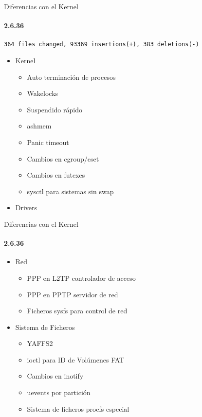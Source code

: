 \documentclass[12pt]{beamer}
\begin{document}
\begin{frame}[fragile]{Diferencias con el Kernel}
    \framesubtitle{2.6.36}
    \begin{lstlisting}
364 files changed, 93369 insertions(+), 383 deletions(-)
    \end{lstlisting}
    \begin{itemize}
        \item Kernel
        \begin{itemize}
            \item Auto terminación de procesos
            \item Wakelocks
            \item Suspendido rápido
            \item ashmem
            \item Panic timeout
            \item Cambios en cgroup/cset
            \item Cambios en futexes
            \item sysctl para sistemas sin swap
        \end{itemize}
        \item Drivers
    \end{itemize}
\end{frame}

\begin{frame}[fragile]{Diferencias con el Kernel}
    \framesubtitle{2.6.36}
    \begin{itemize}
        \item Red
        \begin{itemize}
            \item PPP en L2TP controlador de acceso
            \item PPP en PPTP servidor de red
            \item Ficheros sysfs para control de red
        \end{itemize}
        \item Sistema de Ficheros
        \begin{itemize}
            \item YAFFS2
            \item ioctl para ID de Volúmenes FAT
            \item Cambios en inotify
            \item uevents por partición
            \item Sistema de ficheros procfs especial
        \end{itemize}
    \end{itemize}
\end{frame}
\end{document}
